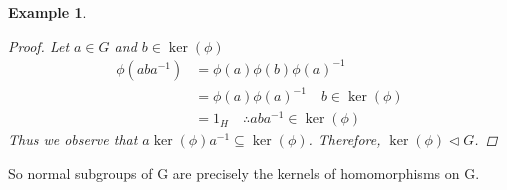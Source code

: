 \documentclass[11pt, oneside]{book}
\theoremstyle{break}
\newtheorem*{proof}{Proof}
\newtheorem{eg}{Example}[section]
\begin{document}
\begin{eg}
\begin{enumerate}
                \begin{proof}
                    Let $a \in G$ and $b \in \ker(\phi)$
                    \begin{align*}
                        \phi(aba^{-1}) &= \phi(a)\phi(b)\phi(a)^{-1} \\
                            &= \phi(a)\phi(a)^{-1} \quad b \in \ker(\phi) \\
                            &= 1_H \quad \therefore aba^{-1} \in \ker(\phi)
                    \end{align*}
                    Thus we observe that $a\ker(\phi)a^{-1} \subseteq \ker(\phi)$. Therefore, $\ker(\phi) \triangleleft G$.
                \end{proof}
    \end{enumerate}
\end{eg}

So normal subgroups of G are precisely the kernels of homomorphisms on G.
\end{document}
